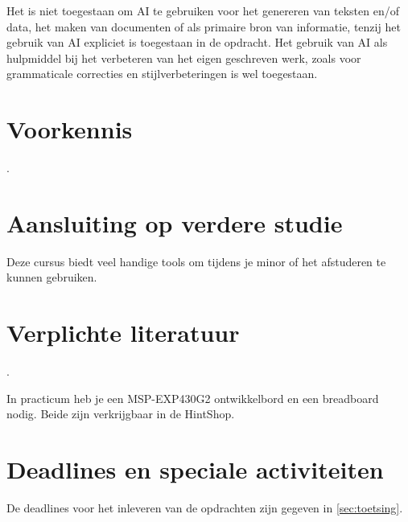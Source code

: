 Het is niet toegestaan om AI te gebruiken voor het genereren van teksten en/of data, het maken van documenten of als primaire bron van informatie, tenzij het gebruik van AI expliciet is toegestaan in de opdracht.
Het gebruik van AI als hulpmiddel bij het verbeteren van het eigen geschreven werk, zoals voor grammaticale correcties en stijlverbeteringen is wel toegestaan.

\section{Voorkennis}
\label{sec:voorkennis}
\Bla{} .

\section{Aansluiting op verdere studie}
\label{sec:aansluiting}
Deze cursus biedt veel handige tools om tijdens je minor of het afstuderen te kunnen gebruiken.

\section{Verplichte literatuur}
\label{sec:verplichteliteratuur}
.

In practicum heb je een MSP-EXP430G2 ontwikkelbord en een breadboard nodig. Beide zijn verkrijgbaar in de HintShop.


\section{Deadlines en speciale activiteiten}
\label{sec:deadlines}
De deadlines voor het inleveren van de opdrachten zijn gegeven in \cref{sec:toetsing}.

